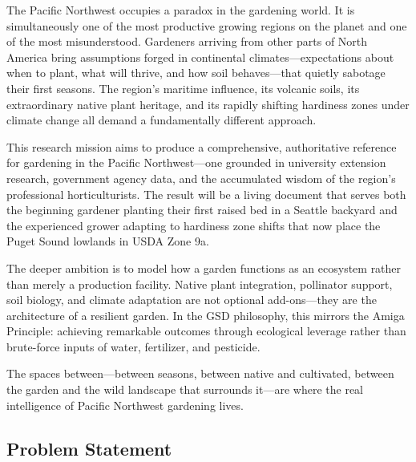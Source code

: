 \documentclass[11pt,letterpaper]{article}
\begin{document}
The Pacific Northwest occupies a paradox in the gardening world. It is simultaneously one of the most productive growing regions on the planet and one of the most misunderstood. Gardeners arriving from other parts of North America bring assumptions forged in continental climates---expectations about when to plant, what will thrive, and how soil behaves---that quietly sabotage their first seasons. The region's maritime influence, its volcanic soils, its extraordinary native plant heritage, and its rapidly shifting hardiness zones under climate change all demand a fundamentally different approach.

This research mission aims to produce a comprehensive, authoritative reference for gardening in the Pacific Northwest---one grounded in university extension research, government agency data, and the accumulated wisdom of the region's professional horticulturists. The result will be a living document that serves both the beginning gardener planting their first raised bed in a Seattle backyard and the experienced grower adapting to hardiness zone shifts that now place the Puget Sound lowlands in USDA Zone 9a.

The deeper ambition is to model how a garden functions as an ecosystem rather than merely a production facility. Native plant integration, pollinator support, soil biology, and climate adaptation are not optional add-ons---they are the architecture of a resilient garden. In the GSD philosophy, this mirrors the Amiga Principle: achieving remarkable outcomes through ecological leverage rather than brute-force inputs of water, fertilizer, and pesticide.

The spaces between---between seasons, between native and cultivated, between the garden and the wild landscape that surrounds it---are where the real intelligence of Pacific Northwest gardening lives.

\subsection{Problem Statement}
\end{document}
